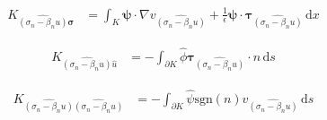 \documentclass[a4paper]{article}
\def\d{\,\mathrm{d}}
\def\dx{\d x}
\def\ds{\d s}
\def\btau{\boldsymbol\tau}
\def\bsigma{\boldsymbol\sigma}
\def\bpsi{\boldsymbol\psi}
\begin{document}
\begin{align*}
K_{\widehat{(\sigma_n-\beta_nu)}\bsigma}&=\int_K
\bpsi\cdot\nabla v_{\widehat{(\sigma_n-\beta_nu)}}
+\frac{1}{\epsilon}\bpsi\cdot\btau_{\widehat{(\sigma_n-\beta_nu)}}\dx
\end{align*}

\begin{align*}
K_{\widehat{(\sigma_n-\beta_nu)}\hat u}&=-\int_{\partial K}
\hat\phi\btau_{\widehat{(\sigma_n-\beta_nu)}}\cdot n\ds
\end{align*}

\begin{align*}
K_{\widehat{(\sigma_n-\beta_nu)}\widehat{(\sigma_n-\beta_nu)}}&=-\int_{\partial K}
\hat\psi\text{sgn}(n)v_{\widehat{(\sigma_n-\beta_nu)}} \ds
\end{align*}
\end{document}
